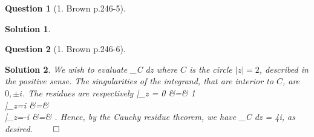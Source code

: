 \documentclass{article} %
\def\eQb#1\eQe{\begin{eqnarray*}#1\end{eqnarray*}}
\theoremstyle{quest}
\newtheorem*{question}{Question}
\newtheorem*{solution}{Solution}
\begin{document}
\bigskip

\begin{question}[1. Brown p.246-5]
\end{question}
\begin{solution}

\end{solution}

\bigskip

\begin{question}[1. Brown p.246-6]
\end{question}
\begin{solution}
We wish to evaluate 
\eQb
\int_{C}  dz
\eQe
where $C$ is the circle $|z| = 2$, described in the positive sense. 
The singularities of the integrand, that are interior to $C$,
are $0, \pm i$. The residues are respectively
\eQb
\dfrac{\cosh(\pi z)}{z^2 +1}|_{z = 0} &=& 1 \\
|_{z=i} &=&  \\
|_{z=-i} &=& .
\eQe 
Hence, by the Cauchy residue theorem, we have
\eQb
\int_{C}  dz = 4\pi i,
\eQe
as desired. $\qed$
\end{solution}
\end{document}
